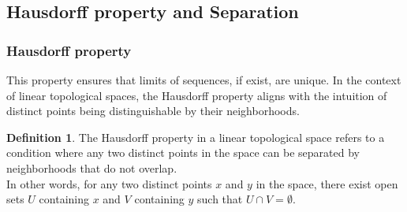 \documentclass[12pt, reqno]{amsart}
\theoremstyle{definition}
\newtheorem{definition}[theorem]{Definition}
\newtheorem{example}[theorem]{Example}
\numberwithin{equation}{section}
\newcommand{\dR}{{\mathbb R}}
\newcommand{\tabb}{\hspace*{1cm}}
\begin{document}
\subsection{Hausdorff property and Separation}
\subsubsection{Hausdorff property} 
This property ensures that limits of sequences, if exist, are unique. In the context of linear topological spaces, the Hausdorff property aligns with the intuition of distinct points being distinguishable by their neighborhoods.
\begin{definition}
    The Hausdorff property in a linear topological space refers to a condition where any two distinct points in the space can be separated by neighborhoods that do not overlap. \\
    In other words, for any two distinct points $x$ and $y$ in the space, there exist open sets $U$ containing $x$ and $V$ containing $y$ such that $U \cap V = \emptyset$.
\end{definition}

\begin{comment}
\begin{example}
Consider the Euclidean space $\dR^n$ equipped with the standard topology. This space is a linear topological space that satisfies the Hausdorff property.\\
\tabb Take two points $x = (x_1, x_2, \dots, x_n)$ and $y = (y_1, y_2, \dots, y_n)$ in $\dR^n$ where $x \neq y$.\\
Because the Euclidean space is Hausdorff, we can find two open balls $B(x, r)$ and $B(y, s)$ centered at $x$ and $y$ respectively, with radii $r > 0$ and $s > 0$, such that these balls do not overlap, meaning $B(x, r) \cap B(y, s) = \emptyset$.\\
\tabb This separation of the points $x$ and $y$ by disjoint open sets (the open balls) demonstrates the Hausdorff property in $\dR^n$.

\end{example}
This example is crucial because it connects abstract topological concepts to familiar, concrete settings and lays the groundwork for more advanced study in various areas of mathematics, such as Uniqueness of Limits, Intuitive Geometry, Foundational in Functional Analysis, or Basis for Generalization.    
\end{comment}
\end{document}

